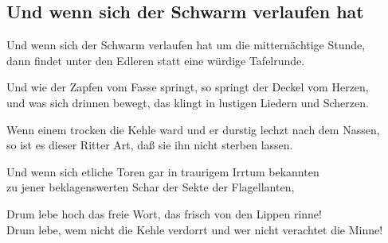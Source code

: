 
\subsection*{Und wenn sich der Schwarm verlaufen hat}
%


\thestrophe Und wenn sich der Schwarm verlaufen hat um die mitternächtige Stunde, \\
dann findet unter den Edleren statt eine würdige Tafelrunde. \\

\thestrophe Und wie der Zapfen vom Fasse springt, so springt der Deckel vom Herzen, \\
und was sich drinnen bewegt, das klingt in lustigen Liedern und Scherzen. \\

\thestrophe Wenn einem trocken die Kehle ward und er durstig lechzt nach dem Nassen, \\
so ist es dieser Ritter Art, daß sie ihn nicht sterben lassen. \\

\thestrophe Und wenn sich etliche Toren gar in traurigem Irrtum bekannten \\
zu jener beklagenswerten Schar der Sekte der Flagellanten, \\

\thestrophe Drum lebe hoch das freie Wort, das frisch von den Lippen rinne! \\
Drum lebe, wem nicht die Kehle verdorrt und wer nicht verachtet die Minne! \\
